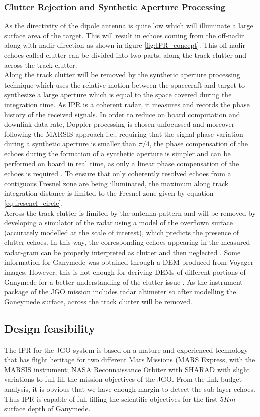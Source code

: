 \subsubsection{Clutter Rejection and Synthetic Aperture Processing}
\label{SAR}
As the directivity of the dipole antenna is quite low which will illuminate a large surface area of the target. This will result in echoes coming from the off-nadir along with nadir direction as shown in figure \ref{fig:IPR_concept}. This off-nadir echoes called clutter can be divided into two parts; along the track clutter and across the track clutter.\\
%
Along the track clutter will be removed by the synthetic aperture processing technique which uses the relative motion between the spacecraft and target to synthesize a large aperture which is equal to the space covered during the integration time. As \ac{IPR} is a coherent radar, it measures and records the phase history of the received signals. In order to reduce on board computation and downlink data rate, Doppler processing is chosen unfocussed and moreover following the \ac{MARSIS} approach i.e., requiring that the signal phase variation during a synthetic aperture is smaller than $\pi/4$, the phase compensation of the echoes during the formation of a synthetic aperture is simpler and can be performed on board in real time, as only a linear phase compensation of the echoes is required \cite{Gany_SRS}. To ensure that only coherently resolved echoes from a contiguous Fresnel zone are being illuminated, the maximum along track integration distance is limited to the Fresnel zone given by equation 
\ref{eq:fresenel_circle}.
\\
Across the track clutter is limited by the antenna pattern and will be removed by developing a simulator of the radar using a model of the overflown surface (accurately modelled at the scale of interest), which predicts the presence of clutter echoes. In this way, the corresponding echoes appearing in the measured radar-gram can be properly interpreted as clutter and then neglected \cite{SHARAD}. Some information for Ganymede was obtained through a \ac{DEM} produced from Voyager images. However, this is not enough  for deriving \acp{DEM} of different portions of Ganymede for a better understanding of the clutter issue \cite{Gany_SRS}. As the instrument package of the \ac{JGO} mission includes radar altimeter so after modelling the Ganeymede surface, across the track clutter will be removed.
\subsection{Design feasibility}
The \ac{IPR} for the \ac{JGO} system is based on a mature and experienced technology that has flight heritage for two different Mars Missions (MARS Express, with the \ac{MARSIS} instrument; NASA Reconnaissance Orbiter with \ac{SHARAD} with slight variations to full fill  the mission objectives of the \ac{JGO}. From the link budget analysis, it is obvious that we have enough margin to detect the sub layer echoes.  Thus \ac{IPR} is capable of full filling the scientific objectives for the first $5 Km$ surface depth of Ganymede.